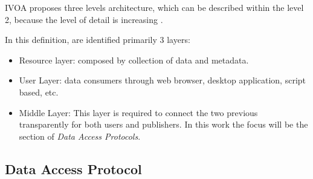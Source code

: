 
IVOA proposes three levels architecture, which can be described within the
level 2, because the level of detail is increasing \cite{arch}.

In this definition, are identified primarily 3 layers:
\begin{itemize}
	\item Resource layer: composed by collection of data and metadata.
	\item User Layer: data consumers through web browser, desktop application, script based, etc.
	\item Middle Layer: This layer is required to connect the two previous
transparently for both users and publishers. In this work the focus will be the
section of \emph{Data Access Protocols}.
\end{itemize}

\subsection{Data Access Protocol}

